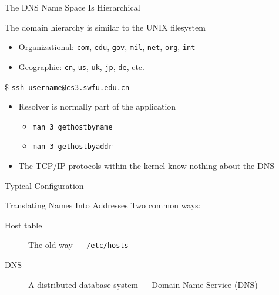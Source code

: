 \begin{frame}{The DNS Name Space Is Hierarchical}
  \begin{iblock}{The domain hierarchy is similar to the UNIX filesystem}
    \begin{center}
    \end{center}\label{fig:dns_tree}
  \end{iblock}
  \begin{itemize}
  \item Organizational: \texttt{com}, \texttt{edu}, \texttt{gov}, \texttt{mil}, \texttt{net},
    \texttt{org}, \texttt{int}
  \item Geographic: \texttt{cn}, \texttt{us}, \texttt{uk}, \texttt{jp}, \texttt{de}, etc.
  \end{itemize}
\end{frame}

\begin{frame}
  \begin{iblock}{\$ \texttt{ssh username@cs3.swfu.edu.cn}}
    \centering
    \mode<beamer>{ \texttt{[image: resolver]} }%
  \end{iblock}
  \begin{itemize}
  \item Resolver is normally part of the application
    \begin{itemize}
    \item \texttt{man 3 gethostbyname}
    \item \texttt{man 3 gethostbyaddr}
    \end{itemize}
  \item The TCP/IP protocols within the kernel know nothing about the DNS
  \end{itemize}
\end{frame}

\begin{frame}{Typical Configuration}
  \begin{center}
     
  \end{center}
\end{frame}

\begin{frame}{Translating Names Into Addresses}
  Two common ways:
  \begin{description}
  \item[Host table] The old way --- \texttt{/etc/hosts}
  \item[DNS] A distributed database system --- Domain Name Service (DNS)
  \end{description}
\end{frame}

